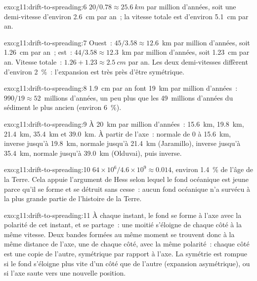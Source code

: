 \begin{solution}{exo:g11:drift-to-spreading:6}
$20/0.78 \approx \qty{25.6}{km}$ par million d'années, soit une demi-vitesse
d'environ \qty{2.6}{cm} par an~; la vitesse totale est d'environ
\qty{5.1}{cm} par an.
\end{solution}

\begin{solution}{exo:g11:drift-to-spreading:7}
Ouest~: $45/3.58 \approx 12.6$~km par million d'années, soit \qty{1.26}{cm}
par an~; est~: $44/3.58 \approx 12.3$~km par million d'années, soit
\qty{1.23}{cm} par an. Vitesse totale~: $1.26 + 1.23 \approx \qty{2.5}{cm}$
par an. Les deux demi-vitesses diffèrent d'environ \qty{2}{\percent}~:
l'expansion est très près d'être symétrique.
\end{solution}

\begin{solution}{exo:g11:drift-to-spreading:8}
\qty{1.9}{cm} par an font \qty{19}{km} par million d'années~:
$990/19 \approx 52$~millions d'années, un peu plus que les 49~millions
d'années du sédiment le plus ancien (environ \qty{6}{\percent}).
\end{solution}

\begin{solution}{exo:g11:drift-to-spreading:9}
À \qty{20}{km} par million d'années~: \qty{15.6}{km}, \qty{19.8}{km},
\qty{21.4}{km}, \qty{35.4}{km} et \qty{39.0}{km}. À partir de l'axe~:
normale de 0 à \qty{15.6}{km}, inverse jusqu'à \qty{19.8}{km}, normale
jusqu'à \qty{21.4}{km} (Jaramillo), inverse jusqu'à \qty{35.4}{km},
normale jusqu'à \qty{39.0}{km} (Olduvai), puis inverse.
\end{solution}

\begin{solution}{exo:g11:drift-to-spreading:10}
$64 \times 10^6/4.6 \times 10^9 \approx \num{0.014}$, environ
\qty{1.4}{\percent} de l'âge de la Terre. Cela appuie l'argument de Hess
selon lequel le fond océanique est jeune parce qu'il se forme et se détruit
sans cesse~: aucun fond océanique n'a survécu à la plus grande partie de
l'histoire de la Terre.
\end{solution}

\begin{solution}{exo:g11:drift-to-spreading:11}
À chaque instant, le fond se forme à l'axe avec la polarité de cet instant,
et se partage~: une moitié s'éloigne de chaque côté à la même vitesse. Deux
bandes formées au même moment se trouvent donc à la même distance de l'axe,
une de chaque côté, avec la même polarité~: chaque côté est une copie de
l'autre, symétrique par rapport à l'axe. La symétrie est rompue si le fond
s'éloigne plus vite d'un côté que de l'autre (expansion asymétrique), ou si
l'axe saute vers une nouvelle position.
\end{solution}

